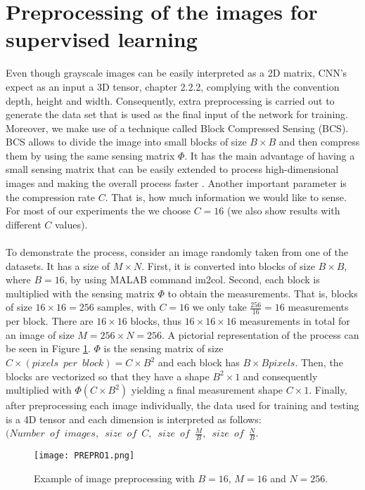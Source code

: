 \section{Preprocessing of the images for supervised learning} \label{sec:prepro}
Even though grayscale images can be easily interpreted as a 2D matrix, CNN's expect as an input a 3D tensor, chapter 2.2.2, complying with the convention depth, height and width. Consequently, extra preprocessing is carried out to generate the data set that is used as the final input of the network for training. Moreover, we make use of a technique called Block Compressed Sensing (BCS). BCS allows to divide the image into small blocks of size $B \times B$ and then compress them by using the same sensing matrix $\Phi$. It has the main advantage of having a small sensing matrix that can be easily extended to process high-dimensional images and making the overall process faster \cite{gan2007block, fowler2012block}. Another important parameter is the compression rate $C$. That is, how much information we would like to sense. For most of our experiments the we choose $C=16$ (we also show results with different $C$ values).           \
\\\\
To demonstrate the process, consider an image randomly taken from one of the datasets. It has a size of $M \times N$. First, it is converted into  blocks of size $B \times B$, where $B=16$, by using MALAB command im2col. Second, each block is multiplied with the sensing matrix $\Phi$ to obtain the measurements. That is, blocks of size $16 \times 16  = 256$ samples, with $C=16$ we only take $ \frac{256}{16}=16$ measurements per block. There are $16 \times 16 $ blocks, thus $16 \times 16 \times 16$ measurements in total for an image of size $M=256 \times N=256$. A pictorial representation of the process can be seen in Figure \ref{fig:PREPROim1}. $\Phi$ is the sensing matrix of size $C \times  ( pixels \enspace per \enspace block) = C \times B^2$ and each block has $B \times B pixels$. Then, the blocks are vectorized so that they have a shape $B^2 \times 1$ and consequently multiplied with $\Phi ( C \times B^2 )$ yielding a final measurement shape $C \times 1 $. Finally, after preprocessing each image individually, the data used for training and testing is a 4D tensor and each dimension is interpreted as follows: $(Number \enspace of \enspace images, \enspace size \enspace of \enspace C ,\enspace size \enspace of \enspace \frac{M}{B} , \enspace size \enspace of \enspace \frac{N}{B}$.  
\begin{figure}[!htb] 
\centering 
\texttt{[image: PREPRO1.png]} 
\caption[Preprocessing of images]{Example of image preprocessing  with $B=16$, $M=16$ and $N=256$.}
\label{fig:PREPROim1} 
\end{figure}

